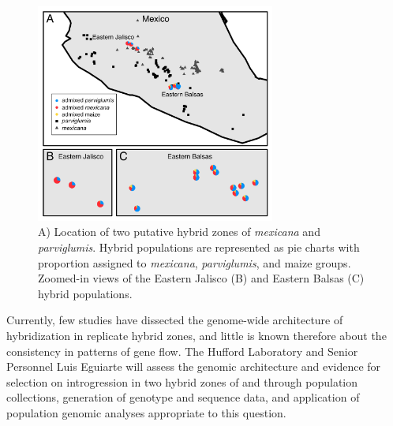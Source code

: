 \begin{figure}[h!]
  \centering
   \includegraphics[width=0.7\textwidth]{Figure1.jpg}
    \caption{A) Location of two putative hybrid zones of \emph{mexicana} and \emph{parviglumis}.  Hybrid populations are represented as pie charts with proportion assigned to \emph{mexicana}, \emph{parviglumis}, and maize groups. Zoomed-in views of the Eastern Jalisco (B) and Eastern Balsas (C) hybrid populations.} 
\label{fig:pies}
\end{figure}
%
%

Currently, few studies have dissected the genome-wide architecture of hybridization in replicate hybrid zones, and little is known therefore about the consistency in patterns of gene flow.
The Hufford Laboratory and Senior Personnel Luis Eguiarte will assess the genomic architecture and evidence for selection on introgression in two hybrid zones of \zm{} and \zp{} through population collections, generation of genotype and sequence data, and application of population genomic analyses appropriate to this question. 


